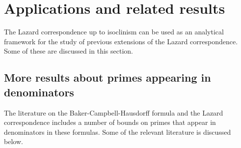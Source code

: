 \documentclass{ucetd}
\begin{document}





\section{Applications and related results}\label{sec:applications}

The Lazard correspondence up to isoclinism can be used as an
analytical framework for the study of previous extensions of the
Lazard correspondence. Some of these are discussed in this section.

\subsection{More results about primes appearing in denominators}

The literature on the Baker-Campbell-Hausdorff formula and the Lazard
correspondence includes a number of bounds on primes that appear in
denominators in these formulas. Some of the relevant literature is
discussed below.
\end{document}
